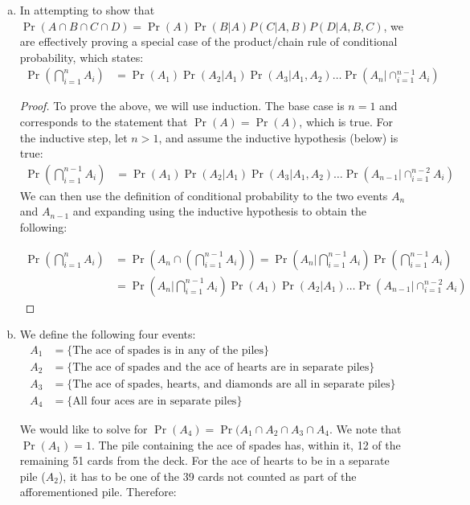 \documentclass[11pt]{article}
\begin{document}
\begin{enumerate}[(a)]
  \item In attempting to show that $\Pr \left( A \cap B \cap C \cap D \right) = \Pr(A)\Pr(B|A)P(C|A,B)P(D|A,B,C)$, we are effectively proving a special case of the product/chain rule of conditional probability, which states:
    \begin{align*}
      \Pr \left( \bigcap_{i=1}^n A_i \right) &= \Pr(A_1) \Pr(A_2 | A_1) \Pr(A_3 | A_1, A_2) \dots \Pr(A_n | \cap_{i=1}^{n-1} A_i)
    \end{align*}
    \begin{proof}
      To prove the above, we will use induction.  The base case is $n=1$ and corresponds to the statement that $\Pr(A) = \Pr(A)$, which is true.  For the inductive step, let $n > 1$, and assume the inductive hypothesis (below) is true:
      \begin{align*}
        \Pr \left( \bigcap_{i=1}^{n-1} A_i \right) &= \Pr(A_1) \Pr(A_2 | A_1) \Pr(A_3 | A_1, A_2) \dots \Pr(A_{n-1} | \cap_{i=1}^{n-2} A_i)
      \end{align*}
      We can then use the definition of conditional probability to the two events $A_n$ and $A_{n-1}$ and expanding using the inductive hypothesis to obtain the following:

      \begin{align*}
        \Pr \left( \bigcap_{i=1}^n A_i \right) &=  \Pr \left(A_n \cap \left( \bigcap_{i=1}^{n-1} A_i \right) \right) = \Pr \left( A_n \bigg| \bigcap_{i=1}^{n-1} A_i \right) \Pr \left( \bigcap_{i=1}^{n-1} A_i \right) \\
        &= \Pr \left( A_n \bigg| \bigcap_{i=1}^{n-1} A_i \right) \Pr(A_1) \Pr(A_2 | A_1) \dots \Pr(A_{n-1} | \cap_{i=1}^{n-2} A_i)
      \end{align*}
    \end{proof}
  \item We define the following four events:
    \begin{align*}
      A_1 &= \{\text{The ace of spades is in any of the piles}\} \\
      A_2 &= \{\text{The ace of spades and the ace of hearts are in separate piles}\} \\
      A_3 &= \{\text{The ace of spades, hearts, and diamonds are all in separate piles}\} \\
      A_4 &= \{\text{All four aces are in separate piles}\}
    \end{align*}

    We would like to solve for $\Pr(A_4) = \Pr(A_1 \cap A_2 \cap A_3 \cap A_4$.  We note that $\Pr(A_1) = 1$.  The pile containing the ace of spades has, within it, 12 of the remaining 51 cards from the deck.  For the ace of hearts to be in a separate pile ($A_2$), it has to be one of the 39 cards not counted as part of the afforementioned pile.  Therefore:


\end{enumerate}
\end{document}
